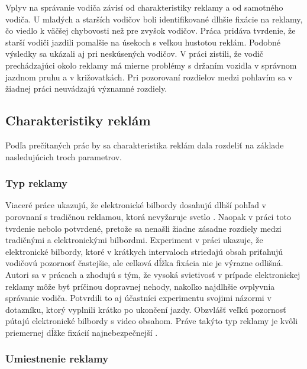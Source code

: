 Vplyv na správanie vodiča závisí od charakteristiky reklamy a od samotného vodiča. U mladých \cite{stavrinos2016visual} a starších vodičov \cite{belyusar2016field, EDQUIST2011619} boli identifikované dlhšie fixácie na reklamy, čo viedlo k väčšej chybovosti než pre zvyšok vodičov. Práca \cite{horberry200813} pridáva tvrdenie, že starší vodiči jazdili pomalšie na úsekoch s veľkou hustotou reklám. Podobné výsledky sa ukázali aj pri neskúsených vodičov. V práci \cite{bendak2010role} zistili, že vodič prechádzajúci okolo reklamy má mierne problémy s držaním vozidla v správnom jazdnom pruhu a v križovatkách. Pri pozorovaní rozdielov medzi pohlavím sa v žiadnej práci neuvádzajú významné rozdiely.

\subsection{Charakteristiky reklám}

Podľa prečítaných prác by sa charakteristika reklám dala rozdeliť  na základe nasledujúcich troch parametrov.

\subsubsection{Typ reklamy}

Viaceré práce ukazujú, že elektronické bilbordy dosahujú dlhší pohľad v porovnaní s tradičnou reklamou, ktorá nevyžaruje svetlo \cite{OVIEDOTRESPALACIOS201985, beijer, brome}. Naopak v práci \cite{n1} toto tvrdenie nebolo potvrdené, pretože sa nenašli žiadne zásadne rozdiely medzi tradičnými a elektronickými bilbordmi. Experiment v práci \cite{brome} ukazuje, že elektronické bilbordy, ktoré v krátkych intervaloch striedajú obsah priťahujú vodičovú pozornosť častejšie, ale celková dĺžka fixácia nie je výrazne odlišná. Autori sa v prácach \cite{mollu2018driving} a \cite{beijer} zhodujú s tým, že vysoká svietivosť v prípade elektronickej reklamy môže byť príčinou dopravnej nehody, nakoľko najdlhšie ovplyvnia správanie vodiča. Potvrdili to aj účastníci experimentu svojimi názormi v dotazníku, ktorý vyplnili krátko po ukončení jazdy. Obzvlášť veľkú pozornosť pútajú elektronické bilbordy s video obsahom. Práve takýto typ reklamy je kvôli priemernej dĺžke fixácií najnebezpečnejší \cite{yellappan2016exposure, smiley2005traffic}.

\subsubsection{Umiestnenie reklamy}


